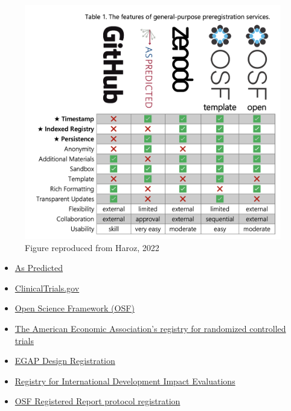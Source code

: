 \documentclass[
  oneside]{book}
\providecommand{\tightlist}{%
  \setlength{\itemsep}{0pt}\setlength{\parskip}{0pt}}
\begin{document}
\begin{figure}

{\centering \includegraphics[width=1\linewidth]{images/reg-repos-haroz} 

}

\caption{Figure reproduced from Haroz, 2022}\label{fig:unnamed-chunk-8}
\end{figure}

\begin{itemize}
\tightlist
\item
  \href{https://aspredicted.org/}{As Predicted}
\item
  \href{https://clinicaltrials.gov/}{ClinicalTrials.gov}
\item
  \href{https://osf.io}{Open Science Framework (OSF)}
\item
  \href{https://www.socialscienceregistry.org/}{The American Economic Association's registry for randomized controlled trials}
\item
  \href{https://egap.org/registry-0/}{EGAP Design Registration}
\item
  \href{http://ridie.3ieimpact.org/}{Registry for International Development Impact Evaluations}
\item
  \href{https://osf.io/rr/}{OSF Registered Report protocol registration}
\end{itemize}

  
\end{document}
